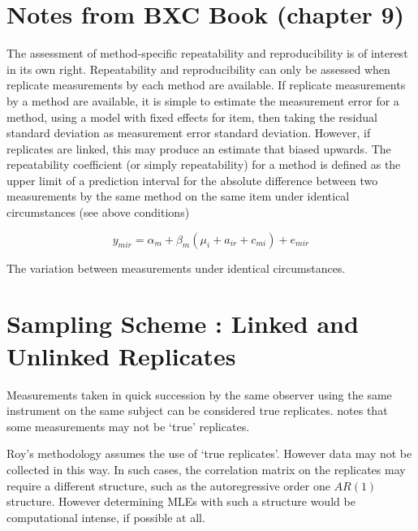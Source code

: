 \documentclass[12pt, a4paper]{report}
\theoremstyle{plain}
\theoremstyle{definition}
\theoremstyle{remark}
\begin{document}
	
	
	
	
	
	
	
	
	
	\newpage
	
	
	\section{Notes from BXC Book (chapter 9)}
	The assessment of method-specific repeatability and reproducibility is of interest in its own right.
	Repeatability and reproducibility can only be assessed when replicate measurements by each method are available.
	If replicate measurements by a method are available, it is simple to estimate the measurement error for a method, using a model with fixed effects for item, then taking the residual standard deviation as measurement error standard deviation.
	However, if replicates are linked, this may produce an estimate that biased upwards.
	The repeatability coefficient (or simply repeatability) for a method is defined as the upper limit of a
	prediction interval for the absolute difference between two measurements by the same method on the same
	item under identical circumstances (see above conditions)
	
	\[y_{mir}  = \alpha_{m} + \beta_m( \mu_i + a_{ir} + c_{mi}) + e_{mir}\]
	
	The variation between measurements under identical circumstances.
	

	
	


\section{Sampling Scheme : Linked and Unlinked Replicates}
	Measurements taken in quick succession by the same observer using the same instrument on the same subject can be considered true replicates. \citet{ARoy2009} notes that some measurements may not be `true' replicates.
	
	Roy's methodology assumes the use of `true replicates'. However data may not be collected in this way. In such cases, the correlation matrix on the replicates may require a different structure, such as the autoregressive order one $AR(1)$ structure. However determining MLEs with such a structure would be computational intense, if possible at all.
	
\end{document}
